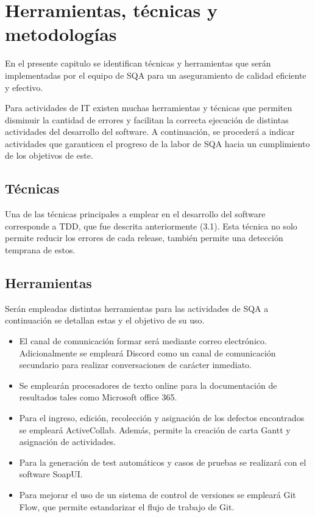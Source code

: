 
\chapter{Herramientas, técnicas y metodologías}

En el presente capitulo se identifican técnicas y herramientas que serán implementadas por el equipo de SQA para un aseguramiento de calidad eficiente y efectivo.

Para actividades de IT existen muchas herramientas y técnicas que permiten disminuir la cantidad de errores y facilitan la correcta ejecución de distintas actividades del desarrollo del software. A continuación, se procederá a indicar actividades que garanticen el progreso de la labor de SQA hacia un cumplimiento de los objetivos de este.

\section{Técnicas}

Una de las técnicas principales a emplear en el desarrollo del software corresponde a TDD, que fue descrita anteriormente (3.1). Esta técnica no solo permite reducir los errores de cada release, también permite una detección temprana de estos.

\section{Herramientas}

Serán empleadas distintas herramientas para las actividades de SQA a continuación se detallan estas y el objetivo de su uso.

\begin{itemize}
	\item 
		El canal de comunicación formar será mediante correo electrónico. Adicionalmente se empleará Discord como un canal de comunicación secundario para realizar conversaciones de carácter inmediato.
	\item
		Se emplearán procesadores de texto online para la documentación de resultados tales como Microsoft office 365.
	\item
		Para el ingreso, edición, recolección y asignación de los defectos encontrados se empleará ActiveCollab. Además, permite la creación de carta Gantt y asignación de actividades.
	\item
		Para la generación de test automáticos y casos de pruebas se realizará con el software SoapUI.
	\item 
		Para mejorar el uso de un sistema de control de versiones se empleará Git Flow, que permite estandarizar el flujo de trabajo de Git.
\end{itemize}

